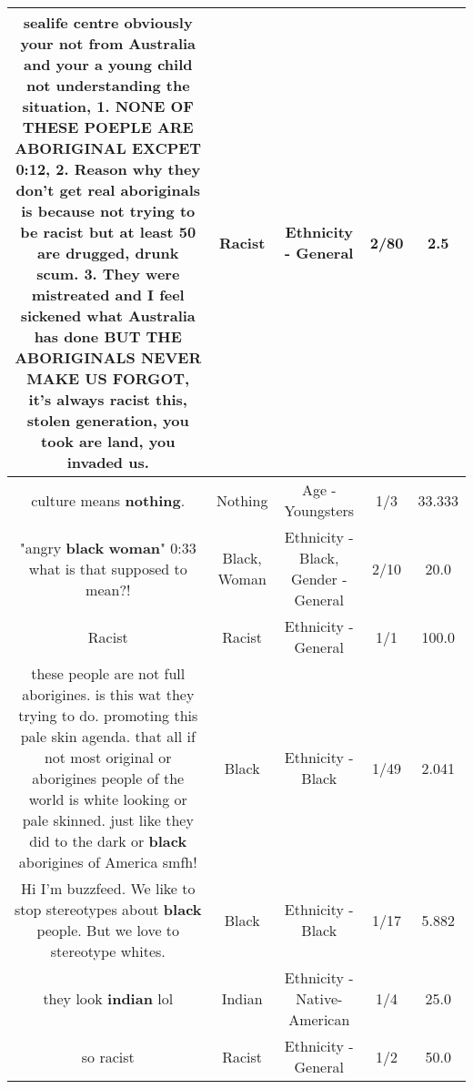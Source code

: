 \documentclass[11pt]{article}
\newlength\mylength
\begin{document}
\begin{center}
\begin{longtable}{|C{.65\mylength}|C{.30\mylength}|C{.12\mylength}|C{.12\mylength}|C{.12\mylength}|}
  \small sealife centre obviously your not from Australia and your a young child not understanding the situation, 1. NONE OF THESE POEPLE ARE ABORIGINAL EXCPET 0:12, 2. Reason why they don't get real aboriginals is because not trying to be \textbf{racist} but at least 50 are drugged, drunk scum.  3. They were mistreated and I feel sickened what Australia has done BUT THE ABORIGINALS NEVER MAKE US FORGOT, it's always \textbf{racist} this, stolen generation, you took are land, you invaded us.\normalsize   & Racist & Ethnicity - General & 2/80 & 2.5 \\  \hline
  \small culture means \textbf{nothing}.\normalsize   & Nothing & Age - Youngsters & 1/3 & 33.333 \\  \hline
  \small "angry \textbf{black} \textbf{woman}" 0:33 what is that supposed to mean?!\normalsize   & Black, Woman & Ethnicity - Black, Gender - General & 2/10 & 20.0 \\  \hline
  \small Racist\normalsize   & Racist & Ethnicity - General & 1/1 & 100.0 \\  \hline
  \small these people are not full aborigines. is this wat they trying to do. promoting this pale skin agenda. that all if not most original or aborigines people of the world is white looking or pale skinned. just like they did to the dark or \textbf{black} aborigines of America smfh!\normalsize   & Black & Ethnicity - Black & 1/49 & 2.041 \\  \hline
  \small Hi I'm buzzfeed. We like to stop stereotypes about \textbf{black} people. But we love to stereotype whites.\normalsize   & Black & Ethnicity - Black & 1/17 & 5.882 \\  \hline
  \small they look \textbf{indian} lol\normalsize   & Indian & Ethnicity - Native-American & 1/4 & 25.0 \\  \hline
  \small so racist\normalsize   & Racist & Ethnicity - General & 1/2 & 50.0 \\  \hline

\end{longtable}
\end{center}
\end{document}

